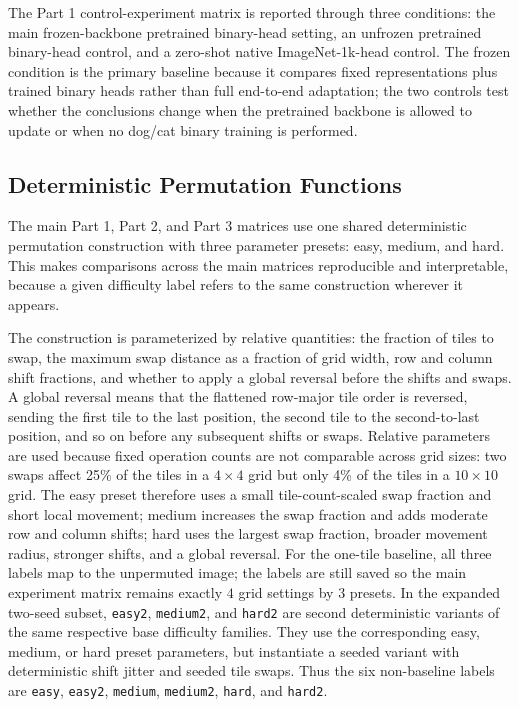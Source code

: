 \documentclass[12pt]{article}
\begin{document}
The Part 1 control-experiment matrix is reported through three conditions: the main frozen-backbone pretrained binary-head setting, an unfrozen pretrained binary-head control, and a zero-shot native ImageNet-1k-head control. The frozen condition is the primary baseline because it compares fixed representations plus trained binary heads rather than full end-to-end adaptation; the two controls test whether the conclusions change when the pretrained backbone is allowed to update or when no dog/cat binary training is performed.

\subsection{Deterministic Permutation Functions}

The main Part 1, Part 2, and Part 3 matrices use one shared deterministic permutation construction with three parameter presets: easy, medium, and hard. This makes comparisons across the main matrices reproducible and interpretable, because a given difficulty label refers to the same construction wherever it appears.

The construction is parameterized by relative quantities: the fraction of tiles to swap, the maximum swap distance as a fraction of grid width, row and column shift fractions, and whether to apply a global reversal before the shifts and swaps. A global reversal means that the flattened row-major tile order is reversed, sending the first tile to the last position, the second tile to the second-to-last position, and so on before any subsequent shifts or swaps. Relative parameters are used because fixed operation counts are not comparable across grid sizes: two swaps affect 25\% of the tiles in a $4 \times 4$ grid but only 4\% of the tiles in a $10 \times 10$ grid. The easy preset therefore uses a small tile-count-scaled swap fraction and short local movement; medium increases the swap fraction and adds moderate row and column shifts; hard uses the largest swap fraction, broader movement radius, stronger shifts, and a global reversal. For the one-tile baseline, all three labels map to the unpermuted image; the labels are still saved so the main experiment matrix remains exactly $4$ grid settings by $3$ presets. In the expanded two-seed subset, \texttt{easy2}, \texttt{medium2}, and \texttt{hard2} are second deterministic variants of the same respective base difficulty families. They use the corresponding easy, medium, or hard preset parameters, but instantiate a seeded variant with deterministic shift jitter and seeded tile swaps. Thus the six non-baseline labels are \texttt{easy}, \texttt{easy2}, \texttt{medium}, \texttt{medium2}, \texttt{hard}, and \texttt{hard2}.
\end{document}
